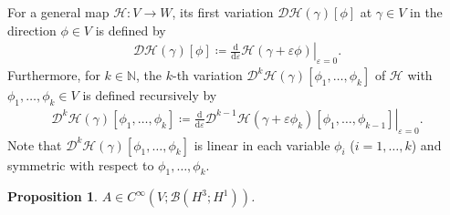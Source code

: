 \documentclass{article}
\newtheorem{proposition}[theorem]{Proposition}
\theoremstyle{remark}
\theoremstyle{definition}
\numberwithin{equation}{section}
\begin{document}
For a general map $\mathcal{H}\colon V\to W$, its first variation $\mathcal{D}\mathcal{H}(\gamma)[\phi]$ at $\gamma\in V$ in the direction $\phi\in V$ is defined by
\begin{align*}
    \mathcal{D}\mathcal{H}(\gamma)[\phi] \coloneqq \left.\frac{\mathrm{d}}{\mathrm{d}\varepsilon}\mathcal{H}(\gamma+\varepsilon\phi)\right|_{\varepsilon=0}.
\end{align*}
Furthermore, for $k\in\mathbb{N}$, the $k$-th variation $\mathcal{D}^k\mathcal{H}(\gamma)[\phi_1,\ldots,\phi_k]$ of $\mathcal{H}$ with $\phi_1,\ldots,\phi_k\in V$ is defined recursively by
\begin{align*}
    \mathcal{D}^k\mathcal{H}(\gamma)[\phi_1,\ldots,\phi_k] \coloneqq \left.\frac{\mathrm{d}}{\mathrm{d}\varepsilon}\mathcal{D}^{k-1}\mathcal{H}(\gamma+\varepsilon\phi_k)[\phi_1,\ldots,\phi_{k-1}]\right|_{\varepsilon=0}.
\end{align*}
Note that $\mathcal{D}^k\mathcal{H}(\gamma)[\phi_1,\ldots,\phi_k]$ is linear in each variable $\phi_i$ ($i=1,\ldots,k$) and symmetric with respect to $\phi_1,\ldots,\phi_k$.

\begin{proposition}
    \label{prop:A_C-inf}
    $A\in C^\infty(V;\mathcal{B}(H^3;H^1))$.
\end{proposition}
\end{document}
